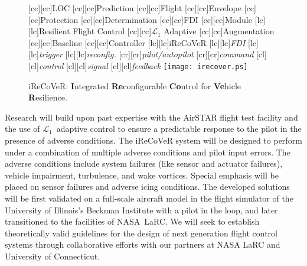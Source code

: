 \documentclass[letter,onecolumn,12pt]{aiaa-tc}
\newcommand{\Lone}{\mathcal{L}_1}
\begin{document}
\begin{figure}
\centering
%
[cc][cc]{{\sf LOC}}
[cc][cc]{{\sf Prediction}}
%
[cc][cc]{{\sf Flight}}
[cc][cc]{{\sf Envelope}}
[cc][cc]{{\sf Protection}}
[cc][cc]{{\sf Determination}}
%
[cc][cc]{{\sf FDI}}
[cc][cc]{{\sf Module}}
%
[lc][lc]{{\sf Resilient Flight Control}}
[cc][cc]{{\sf $\Lone$ Adaptive}}
[cc][cc]{{\sf Augmentation}}
[cc][cc]{{\sf Baseline}}
[cc][cc]{{\sf Controller}}
%
[lc][lc]{{\sf iReCoVeR}}
%
[lc][lc]{{\sf \it FDI}}
[lc][lc]{{\sf \it trigger}}
%
[lc][lc]{{\sf \it reconfig.}}
%
[cr][cr]{{\sf \it pilot/autopilot}}
[cr][cr]{{\sf \it command}}
[cl][cl]{{\sf \it control}}
[cl][cl]{{\sf \it signal}}
[cl][cl]{{\sf \it feedback}}
%
\vspace{-4mm}
\texttt{[image: irecover.ps]}
\caption*{\footnotesize iReCoVeR: \textbf{I}ntegrated \textbf{Re}configurable \textbf{Co}ntrol for \textbf{Ve}hicle \textbf{R}esilience.}
\label{fig:IReCoVeR}
\end{figure}

\vspace{-1mm}
Research will build upon past expertise with the AirSTAR flight test facility and the use of $\Lone$~adaptive control to ensure a predictable response to the pilot in the presence of adverse conditions. The iReCoVeR system will be designed to perform under a combination of multiple adverse conditions and pilot input errors. The adverse conditions include system failures (like sensor and actuator failures), vehicle impairment, turbulence, and wake vortices. Special emphasis will be placed on sensor failures and adverse icing conditions. The developed solutions will be first validated on a full-scale aircraft model in the flight simulator of the University of Illinois's Beckman Institute with a pilot in the loop, and later transitioned to the facilities of NASA~LaRC. We will seek to establish theoretically valid guidelines for the design of next generation flight control systems through collaborative efforts with our partners at NASA LaRC and University of Connecticut.
\end{document}
